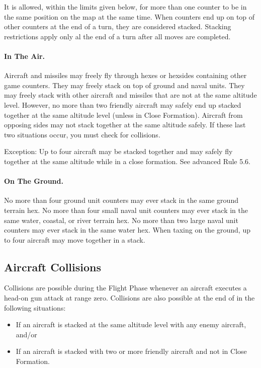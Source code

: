 It is allowed, within the limits given below, for more than one counter to be in the same position on the map at the same time. When counters end up on top of other counters at the end of a turn, they are considered stacked. Stacking restrictions apply only al the end of a turn after all moves are completed.

\paragraph{In The Air.} Aircraft and missiles may freely fly through hexes or hexsides containing other game counters. They may freely stack on top of ground and naval units. They may freely stack with other aircraft and missiles that are not at the same altitude level. However, no more than two friendly aircraft may safely end up stacked together at the same altitude level (unless in Close Formation). Aircraft from opposing sides may not stack together at the same altitude safely. If these last two situations occur, you must check for collisions.

Exception: Up to four aircraft may be stacked together and may safely fly together at the same altitude while in a close formation. See advanced Rule 5.6.

\paragraph{On The Ground.} No more than four ground unit counters may ever stack in the same ground terrain hex. No more than four small naval unit counters may ever stack in the same water, coastal, or river terrain hex. No more than two large naval unit counters may ever stack in the same water hex. When taxing on the ground, up to four aircraft may move together in a stack.

\subsection{Aircraft Collisions}

Collisions are possible during the Flight Phase whenever an aircraft executes a head-on gun attack at range zero. Collisions are also possible at the end of  in the following situations:

\begin{itemize}
    \item If an aircraft is stacked at the same altitude level with any enemy aircraft, and/or
    \item If an aircraft is stacked with two or more friendly aircraft and not in Close Formation.
\end{itemize}

